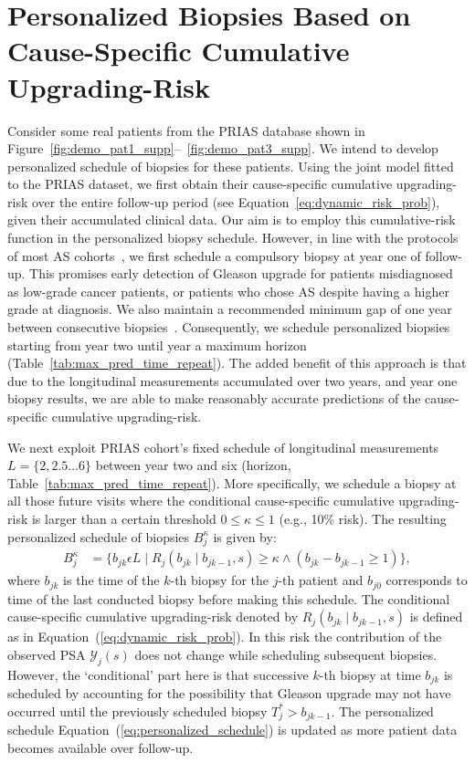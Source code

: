 \section{Personalized Biopsies Based on Cause-Specific Cumulative Upgrading-Risk}
Consider some real patients from the PRIAS database shown in Figure~\ref{fig:demo_pat1_supp}--~\ref{fig:demo_pat3_supp}. We intend to develop personalized schedule of biopsies for these patients. Using the joint model fitted to the PRIAS dataset, we first obtain their cause-specific cumulative upgrading-risk over the entire follow-up period (see Equation~\ref{eq:dynamic_risk_prob}), given their accumulated clinical data. Our aim is to employ this cumulative-risk function in the personalized biopsy schedule. However, in line with the protocols of most AS cohorts~\citep{nieboer2018active}, we first schedule a compulsory biopsy at year one of follow-up. This promises early detection of Gleason upgrade for patients misdiagnosed as low-grade cancer patients, or patients who chose AS despite having a higher grade at diagnosis. We also maintain a recommended minimum gap of one year between consecutive biopsies~\citep{bokhorst2015compliance}. Consequently, we schedule personalized biopsies starting from year two until year a maximum horizon (Table~\ref{tab:max_pred_time_repeat}). The added benefit of this approach is that due to the longitudinal measurements accumulated over two years, and year one biopsy results, we are able to make reasonably accurate predictions of the cause-specific cumulative upgrading-risk. 

We next exploit PRIAS cohort's fixed schedule of longitudinal measurements ${L=\{2, 2.5 \ldots 6\}}$ between year two and six (horizon, Table~\ref{tab:max_pred_time_repeat}). More specifically, we schedule a biopsy at all those future visits where the conditional cause-specific cumulative upgrading-risk is larger than a certain threshold $0 \leq \kappa \leq 1$ (e.g., 10\% risk). The resulting personalized schedule of biopsies $B_j^{\kappa}$ is given by:
\begin{equation}
\label{eq:personalized_schedule}
\begin{split}
B_j^{\kappa} &= \Big\{b_{jk} \epsilon L \mid R_j(b_{jk} \mid b_{jk-1}, s) \geq \kappa \land (b_{jk}-b_{jk-1}\geq 1) \Big\},
\end{split}
\end{equation}
where $b_{jk}$ is the time of the $k$-th biopsy for the $j$-th patient and $b_{j0}$ corresponds to time of the last conducted biopsy before making this schedule. The conditional cause-specific cumulative upgrading-risk denoted by $R_j(b_{jk} \mid b_{jk-1}, s)$ is defined as in Equation~(\ref{eq:dynamic_risk_prob}). In this risk the contribution of the observed PSA $\mathcal{Y}_{j}(s)$ does not change while scheduling subsequent biopsies. However, the `conditional' part here is that successive $k$-th biopsy at time $b_{jk}$ is scheduled by accounting for the possibility that Gleason upgrade may not have occurred until the previously scheduled biopsy $T^*_j > b_{jk-1}$. The personalized schedule Equation~(\ref{eq:personalized_schedule}) is updated as more patient data becomes available over follow-up.

